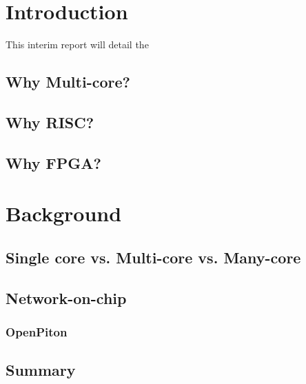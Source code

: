 \chapter{Introduction}
This interim report will detail the 

    \section{Why Multi-core?}
    \section{Why RISC?}
    \section{Why FPGA?}
\chapter{Background}
    \section{Single core vs. Multi-core vs. Many-core}
    \section{Network-on-chip}
        \subsection{OpenPiton}
    \section{Summary}